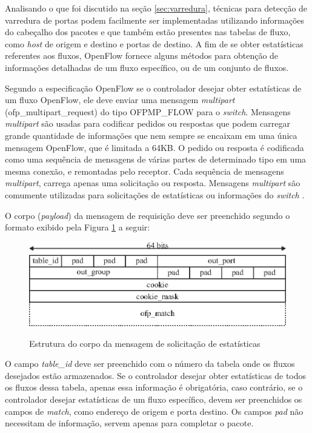 Analisando o que foi discutido na seção \ref{sec:varredura}, técnicas para detecção de varredura de portas podem facilmente ser implementadas utilizando informações do cabeçalho dos pacotes e que também estão presentes nas tabelas de fluxo, como \textit{host} de origem e destino e portas de destino. A fim de se obter estatísticas referentes aos fluxos, OpenFlow fornece alguns métodos para obtenção de informações detalhadas de um fluxo específico, ou de um conjunto de fluxos.

Segundo a especificação OpenFlow \cite{OpenFlowSpec:2014} se o controlador desejar obter estatísticas de um fluxo OpenFlow, ele deve enviar uma mensagem \textit{multipart} (ofp\_multipart\_request) do tipo OFPMP\_FLOW para o \textit{switch}. Mensagens \textit{multipart} são usadas para codificar pedidos ou respostas que podem carregar grande quantidade de informações que nem sempre se encaixam em uma única mensagem OpenFlow, que é limitada a 64KB. O pedido ou resposta é codificada como uma sequência de mensagens de várias partes de determinado tipo em uma mesma conexão, e remontadas pelo receptor. Cada sequência de mensagens \textit{multipart}, carrega apenas uma solicitação ou resposta. Mensagens \textit{multipart} são comumente utilizadas para solicitações de estatísticas ou informações do \textit{switch} \cite{OpenFlowSpec:2014}.

O corpo (\textit{payload}) da mensagem de requisição deve ser preenchido segundo o formato exibido pela Figura \ref{fig:ofp-multipart-request} a seguir:

\begin{figure}[H]
  \centering
  \caption{Estrutura do corpo da mensagem de solicitação de estatísticas}
  \includegraphics[width=.80\textwidth]{images/ofp-flow-stats-request.eps}
  \label{fig:ofp-multipart-request}
\end{figure}

O campo \textit{table\_id} deve ser preenchido com o número da tabela onde os fluxos desejados estão armazenados. Se o controlador desejar obter estatísticas de todos os fluxos dessa tabela, apenas essa informação é obrigatória, caso contrário, se o controlador desejar estatísticas de um fluxo específico, devem ser preenchidos os campos de \textit{match}, como endereço de origem e porta destino. Os campos \textit{pad} não necessitam de informação, servem apenas para completar o pacote.

